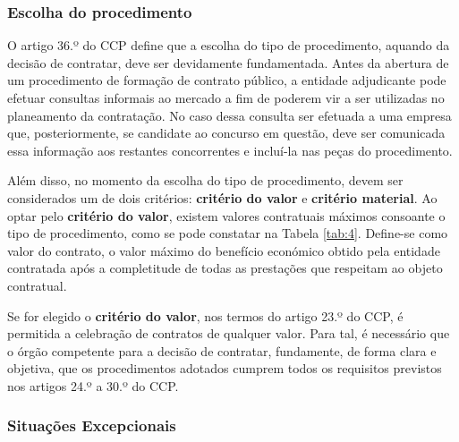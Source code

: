  




\subsubsection{Escolha do procedimento}

O artigo 36.º do CCP define que a escolha do tipo de procedimento, aquando da decisão de contratar, deve ser devidamente fundamentada. Antes da abertura de um procedimento de formação de contrato público, a entidade adjudicante pode efetuar consultas informais ao mercado a fim de poderem vir a ser utilizadas no planeamento da contratação. No caso dessa consulta ser efetuada a uma empresa que, posteriormente, se candidate ao concurso em questão, deve ser comunicada essa informação aos restantes concorrentes e incluí-la nas peças do procedimento\cite{guia_poise}.

Além disso, no momento da escolha do tipo de procedimento, devem ser considerados um de dois critérios: \textbf{critério do valor} e \textbf{critério material}. 
Ao optar pelo \textbf{critério do valor}, existem valores contratuais máximos consoante o tipo de procedimento, como se pode constatar na Tabela \ref{tab:4}. Define-se como valor do contrato, o valor máximo do benefício económico obtido pela entidade contratada após a completitude de todas as prestações que respeitam ao objeto contratual.

Se for elegido o \textbf{critério do valor}, nos termos do artigo 23.º do CCP, é permitida a celebração de contratos de qualquer valor. Para tal, é necessário que o órgão competente para a decisão de contratar, fundamente, de forma clara e objetiva, que os procedimentos adotados cumprem todos os requisitos previstos nos artigos 24.º a 30.º do CCP.




\subsubsection{Situações Excepcionais}


